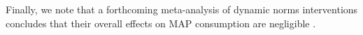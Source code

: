 \documentclass[sn-nature,referee,pdflatex]{sn-jnl}
\begin{document}
Finally, we note that a forthcoming meta-analysis of dynamic norms
interventions concludes that their overall effects on MAP consumption
are negligible \citep{Weikertova2024}.

\begin{comment}
Some discussion about what's meaningful? mention that ease of implementation matters in terms of what’s meaningful. The costs of fully exposing one person is the relevant denominator. The costs of recruitment are part of the cost. Maybe some people are more amenable to nudges after hearing an argument for
\end{comment}

\newpage

\renewcommand\refname{References}

\end{document}
